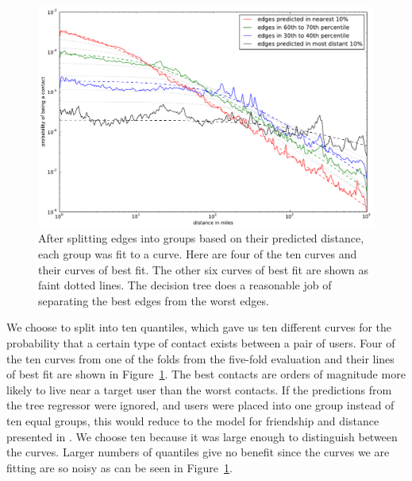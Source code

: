 \begin{figure}[tbh]
\centering
\includegraphics[width=\linewidth]{figures/vect_fit.pdf}
\caption{
After splitting edges into groups based on their predicted distance, each group
was fit to a curve. Here are four of the ten curves and their curves of best
fit. The other six curves of best fit are shown as faint dotted lines. The
decision tree does a reasonable job of separating the best edges from the worst
edges.
}
\label{fig:NearProbFit}
\end{figure}

We choose to split into ten quantiles, which gave us ten different curves for the
probability that a certain type of contact exists between a pair of users.
%
Four of the ten curves from one of the folds from the five-fold evaluation and
their lines of best fit are shown in Figure~\ref{fig:NearProbFit}.
%
The best contacts are orders of magnitude more
likely to live near a target user than the worst contacts.
%
If the predictions from the tree regressor were ignored, and users were placed
into one group instead of ten equal groups, this would reduce to the model
for friendship and distance presented in \cite{backstrom2010find}.
%
We choose ten because it was large enough to distinguish between the curves.
%
Larger numbers of quantiles give no benefit since the curves we are
fitting are so noisy as can be seen in Figure~\ref{fig:NearProbFit}.

